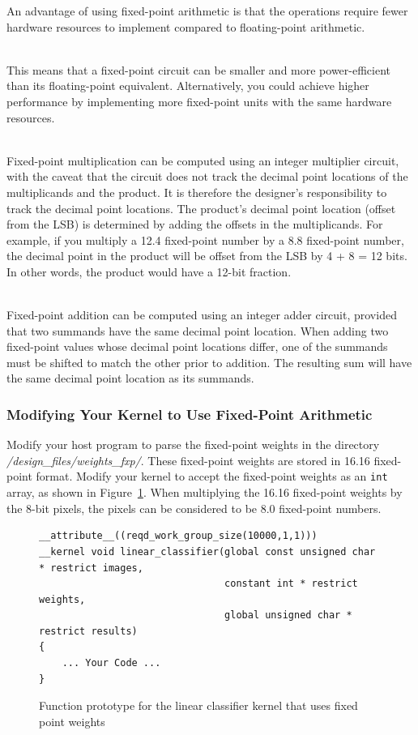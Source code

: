 \documentclass[epsfig,10pt,fullpage]{article}
\begin{document}
An advantage of using fixed-point arithmetic is that the operations require fewer hardware resources to implement 
compared to floating-point arithmetic. 

~\\
This means that a fixed-point circuit can be smaller and more power-efficient than its floating-point equivalent. 
Alternatively, you could achieve higher performance by implementing more fixed-point units with the same hardware resources.

~\\
Fixed-point multiplication can be computed using an integer multiplier circuit, with the caveat that the circuit
does not track the decimal point locations of the multiplicands and the product. 
It is therefore the designer's responsibility to track the decimal point locations.
The product's decimal point location (offset from the LSB) is determined by adding the offsets in the multiplicands.
For example, if you multiply a 12.4 fixed-point number by a 8.8 fixed-point number, the decimal point in the product
will be offset from the LSB by 4 + 8 = 12 bits. In other words, the product would have a 12-bit fraction.

~\\
Fixed-point addition can be computed using an integer adder circuit, provided that two summands have the same decimal point location. 
When adding two fixed-point values whose decimal point locations differ, one of the summands must be shifted to match the other prior to addition.
The resulting sum will have the same decimal point location as its summands.


\subsubsection*{Modifying Your Kernel to Use Fixed-Point Arithmetic}

Modify your host program to parse the fixed-point weights in the directory \textit{/design\_files/weights\_fxp/}.
These fixed-point weights are stored in 16.16 fixed-point format. 
Modify your kernel to accept the fixed-point weights as an \texttt{int} array, as shown in Figure~\ref{fig:kernel_v2}. 
When multiplying the 16.16 fixed-point weights by the 8-bit pixels, the pixels can be considered to be
8.0 fixed-point numbers. 


\lstset{language=C}
\begin{figure}[H]
\begin{center}
\begin{minipage}[t]{16 cm}
\begin{lstlisting}
__attribute__((reqd_work_group_size(10000,1,1)))
__kernel void linear_classifier(global const unsigned char * restrict images, 
								constant int * restrict weights,
								global unsigned char * restrict results)
{
	... Your Code ...
}
\end{lstlisting}
\end{minipage}
\end{center}
\vspace{-0.33in}\caption{Function prototype for the linear classifier kernel that uses fixed point weights}
\label{fig:kernel_v2}
\end{figure}
\end{document}
